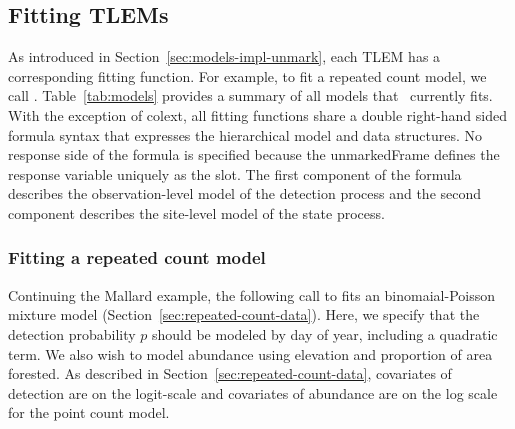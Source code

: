\documentclass[article,shortnames]{jss}
\newcommand{\um}{\pkg{unmarked}}
\begin{document}






\subsection{Fitting TLEMs}
\label{sec:fitting-models}

As introduced in Section~\ref{sec:models-impl-unmark}, each TLEM has a
corresponding fitting function.  For example, to fit a repeated count
model, we call .  Table~\ref{tab:models} provides a
summary of all models that \um\ currently fits.  With the exception of colext,
all fitting functions
share a double right-hand sided formula syntax that expresses the
hierarchical model and data structures.  No response side of the formula is
specified because the unmarkedFrame defines the response variable
uniquely as the  slot.  The first component of the formula
describes the observation-level model of the detection process and the
second component describes the site-level model of the state process.

\subsubsection{Fitting a repeated count model}

Continuing the Mallard example, the following call to 
fits an binomaial-Poisson mixture model
(Section~\ref{sec:repeated-count-data}).  Here, we specify that the
detection probability $p$ should be modeled by day of year, including
a quadratic term.  We also wish to model abundance using elevation and
proportion of area forested.  As described in
Section~\ref{sec:repeated-count-data}, covariates of detection are on
the logit-scale and covariates of abundance are on the log scale for
the point count model.
\end{document}
